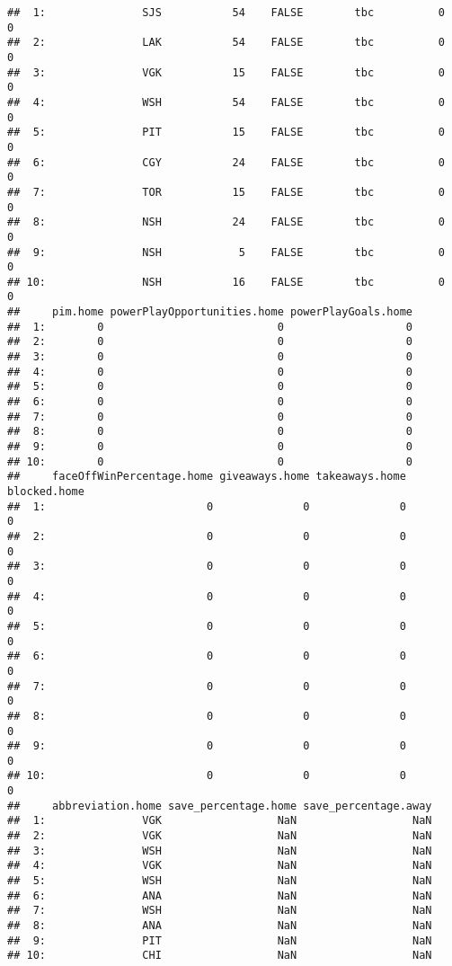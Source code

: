 \documentclass[
]{article}
\begin{document}
\begin{verbatim}
##  1:               SJS           54    FALSE        tbc          0         0
##  2:               LAK           54    FALSE        tbc          0         0
##  3:               VGK           15    FALSE        tbc          0         0
##  4:               WSH           54    FALSE        tbc          0         0
##  5:               PIT           15    FALSE        tbc          0         0
##  6:               CGY           24    FALSE        tbc          0         0
##  7:               TOR           15    FALSE        tbc          0         0
##  8:               NSH           24    FALSE        tbc          0         0
##  9:               NSH            5    FALSE        tbc          0         0
## 10:               NSH           16    FALSE        tbc          0         0
##     pim.home powerPlayOpportunities.home powerPlayGoals.home
##  1:        0                           0                   0
##  2:        0                           0                   0
##  3:        0                           0                   0
##  4:        0                           0                   0
##  5:        0                           0                   0
##  6:        0                           0                   0
##  7:        0                           0                   0
##  8:        0                           0                   0
##  9:        0                           0                   0
## 10:        0                           0                   0
##     faceOffWinPercentage.home giveaways.home takeaways.home blocked.home
##  1:                         0              0              0            0
##  2:                         0              0              0            0
##  3:                         0              0              0            0
##  4:                         0              0              0            0
##  5:                         0              0              0            0
##  6:                         0              0              0            0
##  7:                         0              0              0            0
##  8:                         0              0              0            0
##  9:                         0              0              0            0
## 10:                         0              0              0            0
##     abbreviation.home save_percentage.home save_percentage.away
##  1:               VGK                  NaN                  NaN
##  2:               VGK                  NaN                  NaN
##  3:               WSH                  NaN                  NaN
##  4:               VGK                  NaN                  NaN
##  5:               WSH                  NaN                  NaN
##  6:               ANA                  NaN                  NaN
##  7:               WSH                  NaN                  NaN
##  8:               ANA                  NaN                  NaN
##  9:               PIT                  NaN                  NaN
## 10:               CHI                  NaN                  NaN
\end{verbatim}
\end{document}
